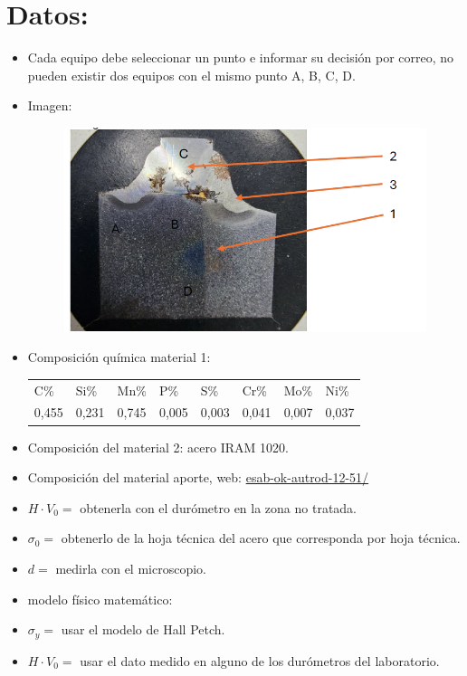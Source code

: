 \documentclass[12pt,a4paper]{article}
\begin{document}
\section{Datos:}
\begin{itemize}
    \item Cada equipo debe seleccionar un punto e informar su decisión por correo, no pueden existir dos equipos con el mismo punto A, B, C, D.
    \item Imagen:
    \begin{figure}[h]
        \centering
        \includegraphics[width=0.5\linewidth]{figuras/imagen 1.png}
        \label{figura1}
    \end{figure}
    \item Composición química material 1:
        \begin{table}[h]
            \begin{tabular}{|l|l|l|l|l|l|l|l|}
            C\%   & Si\%  & Mn\%  & P\%   & S\%   & Cr\%  & Mo\%  & Ni\%  \\
            0,455 & 0,231 & 0,745 & 0,005 & 0,003 & 0,041 & 0,007 & 0,037
            \end{tabular}
        \end{table}
    \item Composición del material 2: acero IRAM 1020.
    \item Composición del material aporte, web: \href{https://esab.com/ar/sam_es/products-solutions/product/filler-metals/mild-steel/mig-wires-tig-rods-gmaw-gtaw/ok-autrod-12-51/}{esab-ok-autrod-12-51/}
    \item \(\textit{H}\cdot\textit{V}_0=\) obtenerla con el durómetro en la zona no tratada.
    \item \(\sigma_0=\) obtenerlo de la hoja técnica del acero que corresponda por hoja técnica.
    \item \(d=\) medirla con el microscopio.
    \item modelo físico matemático:
    \item \(\sigma_y=\) usar el modelo de Hall Petch.
    \item \(\textit{H}\cdot\textit{V}_0=\) usar el dato medido en alguno de los durómetros del laboratorio.
\end{itemize}
\end{document}
